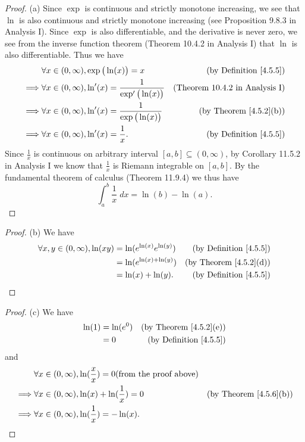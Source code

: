 \begin{proof}{(a)}
    Since \(\exp\) is continuous and strictly monotone increasing, we see that \(\ln\) is also continuous and strictly monotone increasing (see Proposition 9.8.3 in Analysis I).
    Since \(\exp\) is also differentiable, and the derivative is never zero, we see from the inverse function theorem (Theorem 10.4.2 in Analysis I) that \(\ln\) is also differentiable.
    Thus we have
    \begin{align*}
                 & \forall x \in (0, \infty), \exp\big(\ln(x)\big) = x                  & \text{(by Definition \ref{4.5.5})}    \\
        \implies & \forall x \in (0, \infty), \ln'(x) = \frac{1}{\exp'\big(\ln(x)\big)} & \text{(Theorem 10.4.2 in Analysis I)} \\
        \implies & \forall x \in (0, \infty), \ln'(x) = \frac{1}{\exp\big(\ln(x)\big)}  & \text{(by Theorem \ref{4.5.2}(b))}    \\
        \implies & \forall x \in (0, \infty), \ln'(x) = \frac{1}{x}.                    & \text{(by Definition \ref{4.5.5})}
    \end{align*}
    Since \(\frac{1}{x}\) is continuous on arbitrary interval \([a, b] \subseteq (0, \infty)\), by Corollary 11.5.2 in Analysis I we know that \(\frac{1}{x}\) is Riemann integrable on \([a, b]\).
    By the fundamental theorem of calculus (Theorem 11.9.4) we thus have
    \[
        \int_a^b \frac{1}{x} \; dx = \ln(b) - \ln(a).
    \]
\end{proof}

\begin{proof}{(b)}
    We have
    \begin{align*}
        \forall x, y \in (0, \infty), \ln(xy) & = \ln(e^{\ln(x)} e^{\ln(y)}) & \text{(by Definition \ref{4.5.5})} \\
                                              & = \ln(e^{\ln(x) + \ln(y)})   & \text{(by Theorem \ref{4.5.2}(d))} \\
                                              & = \ln(x) + \ln(y).           & \text{(by Definition \ref{4.5.5})}
    \end{align*}
\end{proof}

\begin{proof}{(c)}
    We have
    \begin{align*}
        \ln(1) & = \ln(e^0) & \text{(by Theorem \ref{4.5.2}(e))} \\
               & = 0        & \text{(by Definition \ref{4.5.5})}
    \end{align*}
    and
    \begin{align*}
                 & \forall x \in (0, \infty), \ln(\frac{x}{x}) = 0 \text{(from the proof above)}                                      \\
        \implies & \forall x \in (0, \infty), \ln(x) + \ln(\frac{1}{x}) = 0                      & \text{(by Theorem \ref{4.5.6}(b))} \\
        \implies & \forall x \in (0, \infty), \ln(\frac{1}{x}) = -\ln(x).
    \end{align*}
\end{proof}

